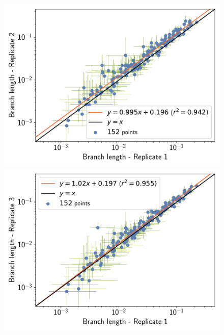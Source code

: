 \documentclass{article}
\begin{document}
	\begin{figure}[H]
		\centering
		\begin{minipage}{0.32\linewidth}
			\includegraphics[width=\linewidth, page=1]{mammals/18CDS_SiteMutSelBranchNe_Rep_Log10BranchLength-1-2}
		\end{minipage} \hfill
		\begin{minipage}{0.32\linewidth}
			\includegraphics[width=\linewidth, page=1]{mammals/18CDS_SiteMutSelBranchNe_Rep_Log10BranchLength-1-3}
		\end{minipage} \hfill
		\begin{minipage}{0.32\linewidth}

\end{minipage}
\end{figure}
\end{document}
